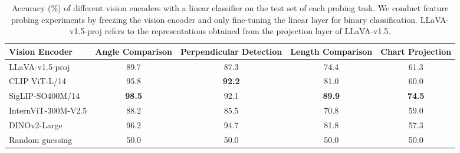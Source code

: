 
\begin{table*}[t]
    \small
    \centering
    \begin{adjustbox}{max width=0.95\textwidth}
    {
    \begin{tabular}{lcccc}
        \toprule
        
        \textbf{Vision Encoder} & \textbf{Angle Comparison} & \textbf{Perpendicular Detection} & \textbf{Length Comparison} & \textbf{Chart Projection}\\
        
        \midrule
        LLaVA-v1.5-proj & 89.7 & 87.3 & 74.4 & 61.3\\
        CLIP ViT-L/14 & 95.8 & \textbf{92.2} & 81.0 & 60.0\\
        SigLIP-SO400M/14 & \textbf{98.5} & 92.1 & \textbf{89.9} & \textbf{74.5}\\
        InternViT-300M-V2.5 & 88.2 & 85.5 & 70.8 & 59.0 \\
        DINOv2-Large & 96.2 & 94.7 & 81.8 & 57.3\\
        \midrule
        Random guessing & 50.0 & 50.0 & 50.0 & 50.0\\
        
        \bottomrule
    \end{tabular}
    }
    \end{adjustbox}
    \vspace{-2mm}
    
    \caption{Accuracy (\%) of different vision encoders with a linear classifier on the test set of each probing task. We conduct feature probing experiments by freezing the vision encoder and only fine-tuning the linear layer for binary classification. LLaVA-v1.5-proj refers to the representations obtained from the projection layer of LLaVA-v1.5.}
    \label{tab:probing_mlp}
    \vspace{-5mm}
\end{table*}

        
        
        
    
